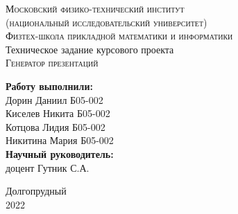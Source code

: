 



  \begin{titlepage}	%

    \thispagestyle{empty}
    \begin{center}		%
      \textsc{Московский физико-технический институт} \\
      \textsc{(национальный исследовательский университет)} \\
      \textsc{Физтех-школа прикладной математики и информатики} \\[6cm]

      \large Техническое задание курсового проекта \\
      \huge \textsc{Генератор презентаций} \\ 
    \end{center}

    \vfill

    \begin{flushright} %
      \begin{minipage}{0.45\textwidth} %
        \begin{flushleft} %

          \large\textbf{Работу выполнили:}\\
          \large Дорин Даниил Б05-002 \\
          \large Киселев Никита Б05-002 \\
          \large Котцова Лидия Б05-002 \\
          \large Никитина Мария Б05-002 \\

          \large \textbf{Научный руководитель:}\\
          \large доцент Гутник С.А.

        \end{flushleft}
      \end{minipage}
    \end{flushright}

    \vfill %

    \begin{center}
      \large Долгопрудный \\
      \large 2022 %
    \end{center} %

    \pagebreak

  \end{titlepage} %
  \newpage

